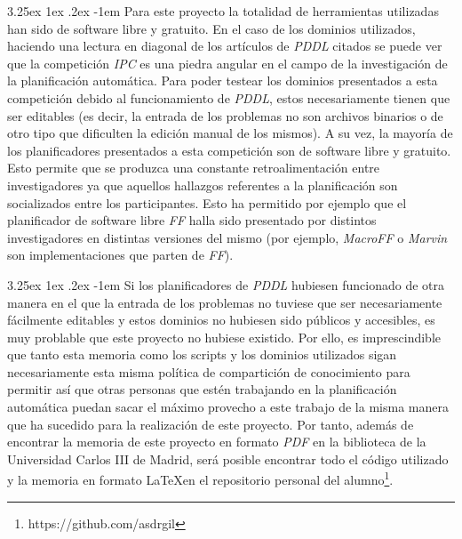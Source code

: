 \documentclass{article}
\makeatletter
\renewcommand\paragraph{\@startsection{paragraph}{5}{\z@}%
      {3.25ex \@plus1ex \@minus.2ex}%
      {-1em}%
      {\normalfont\normalsize\bfseries}}
\makeatother
\begin{document}
    \paragraph{}
    Para este proyecto la totalidad de herramientas utilizadas han sido de software libre y gratuito. En el caso de los dominios utilizados, haciendo una lectura en diagonal de los artículos de \textit{PDDL} citados se puede ver que la competición \textit{IPC} es una piedra angular en el campo de la investigación de la planificación automática. Para poder testear los dominios presentados a esta competición debido al funcionamiento de \textit{PDDL}, estos necesariamente tienen que ser editables (es decir, la entrada de los problemas no son archivos binarios o de otro tipo que dificulten la edición manual de los mismos). A su vez, la mayoría de los planificadores presentados a esta competición son de software libre y gratuito. Esto permite que se produzca una constante retroalimentación entre investigadores ya que aquellos hallazgos referentes a la planificación son socializados entre los participantes. Esto ha permitido por ejemplo que el planificador de software libre \textit{FF} halla sido presentado por distintos investigadores en distintas versiones del mismo (por ejemplo, \textit{MacroFF} o \textit{Marvin} son implementaciones que parten de \textit{FF}).
    
    \paragraph{}
    Si los planificadores de \textit{PDDL} hubiesen funcionado de otra manera en el que la entrada de los problemas no tuviese que ser necesariamente fácilmente editables y estos dominios no hubiesen sido públicos y accesibles, es muy problable que este proyecto no hubiese existido. Por ello, es imprescindible que tanto esta memoria como los scripts y los dominios utilizados sigan necesariamente esta misma política de compartición de conocimiento para permitir así que otras personas que estén trabajando en la planificación automática puedan sacar el máximo provecho a este trabajo de la misma manera que ha sucedido para la realización de este proyecto. Por tanto, además de encontrar la memoria de este proyecto en formato \textit{PDF} en la biblioteca de la Universidad Carlos III de Madrid, será posible encontrar todo el código utilizado y la memoria en formato \LaTeX en el repositorio personal del alumno\footnote{https://github.com/asdrgil}.
    
\end{document}
